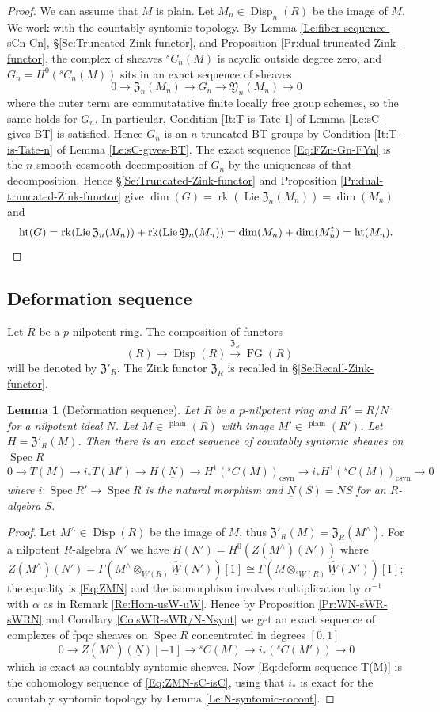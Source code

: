 \documentclass[a4paper,11pt]{amsart}
\theoremstyle{plain}
\newtheorem{Lemma}[equation]{Lemma}
\theoremstyle{definition}
\theoremstyle{remark}
\newcommand{\bLe}{\begin{Lemma}}
\newcommand{\eLe}{\end{Lemma}}
\newcommand{\bproof}{\begin{proof}}
\newcommand{\eproof}{\end{proof}}
\newcommand{\beqn}{\begin{equation}}
\newcommand{\eeqn}{\end{equation}}
\renewcommand{\u}{\underline}
\newcommand{\uM}{M} %
\numberwithin{equation}{section}
\newcommand{\FY}{\mathfrak{Y}}
\newcommand{\FZ}{\mathfrak{Z}}
\DeclareMathOperator{\csyn}{csyn}
\DeclareMathOperator{\height}{ht}
\DeclareMathOperator{\plain}{plain}
\DeclareMathOperator{\rk}{rk}
\DeclareMathOperator{\Disp}{Disp}
\DeclareMathOperator{\sDisp}{{}^sDisp}
\DeclareMathOperator{\FG}{FG}
\DeclareMathOperator{\Lie}{Lie}
\DeclareMathOperator{\Spec}{Spec}
\newcommand{\sC}{{}^{s}C}
\newcommand{\usW}{{}^s\u W}
\begin{document}
\bproof
We can assume that $\uM$ is plain.
Let $\uM_n\in\Disp_n(R)$ be the image of $\uM$.
We work with the countably syntomic topology.
By Lemma \ref{Le:fiber-sequence-sCn-Cn}, \S \ref{Se:Truncated-Zink-functor}, and Proposition \ref{Pr:dual-truncated-Zink-functor}, the complex of sheaves $\sC_n(\uM)$ is acyclic outside degree zero, and $G_n=H^0(\sC_n(\uM))$ sits in an exact sequence of sheaves
\beqn
\label{Eq:FZn-Gn-FYn}
0\to\FZ_n(\uM_n)\to G_n\to\FY_n(\uM_n)\to 0
\eeqn
where the outer term are commutatative finite locally free group schemes, so the same holds for $G_n$. 
In particular, Condition \eqref{It:T-is-Tate-1} of Lemma \ref{Le:sC-gives-BT} is satisfied. 
Hence $G_n$ is an $n$-truncated BT groups by Condition \eqref{It:T-is-Tate-n} of Lemma \ref{Le:sC-gives-BT}.
The exact sequence \eqref{Eq:FZn-Gn-FYn} is the $n$-smooth-cosmooth decomposition of $G_n$ by the uniqueness of that decomposition. Hence \S\ref{Se:Truncated-Zink-functor} and Proposition \ref{Pr:dual-truncated-Zink-functor} give $\dim(G)=\rk(\Lie\FZ_n(\uM_n))=\dim(\uM_n)$ and 
\[
\height(G)=\rk(\Lie\FZ_n(\uM_n))+\rk(\Lie\FY_n(\uM_n))=\dim(\uM_n)+\dim(\uM_n^t)=\height(\uM_n).
\qedhere
\]
\eproof

\subsection{Deformation sequence} 
\label{Se:Tate:deform-seq}

Let $R$ be a $p$-nilpotent ring. The composition of functors
\[
\sDisp(R)\to\Disp(R)\xrightarrow{\FZ_R}\FG(R)
\] 
will be denoted by $\FZ'_R$. The Zink functor $\FZ_R$ is recalled in \S\ref{Se:Recall-Zink-functor}.

\bLe[Deformation sequence]
\label{Le:deform-sequence-TM}
Let $R$ be a $p$-nilpotent ring and $R'=R/N$ for a nilpotent ideal $N$. Let $\uM\in\sDisp^{\plain}(R)$ with image $\uM'\in\sDisp^{\plain}(R')$. Let $H=\FZ'_R(\uM)$. Then there is an exact sequence of countably syntomic sheaves on $\Spec R$ 
\beqn
\label{Eq:deform-sequence-T(M)}
0\to T(\uM)\to i_*T(\uM')\to H(\u N)\to H^1(\sC(\uM))_{\csyn}\to i_*H^1(\sC(\uM))_{\csyn}\to 0
\eeqn
where $i\colon \Spec R'\to \Spec R$ is the natural morphism and $\u N(S)=NS$ for an $R$-algebra $S$. 
\eLe

\bproof
Let $\uM^\wedge\in\Disp(R)$ be the image of $\uM$, thus $\FZ'_R(\uM)=\FZ_R(\uM^\wedge)$. For a nilpotent $R$-algebra $N'$ we have $H(N')=H^0(Z(\uM^\wedge)(N'))$ where 
\[
Z(\uM^\wedge)(N')=\Gamma(\uM^\wedge\otimes_{\u W(R)}\u{\hat W}(N')) [1] 
\cong\Gamma(\uM\otimes_{\usW(R)}\u{\hat W}(N')) [1];
\]
the equality is \eqref{Eq:ZMN} and the isomorphism involves multiplication by $\alpha^{-1}$ with $\alpha$ as in Remark \ref{Re:Hom-usW-uW}. Hence by Proposition \ref{Pr:WN-sWR-sWRN} and Corollary \ref{Co:sWR-sWR/N-Nsynt} we get an exact sequence of complexes of fpqc sheaves on $\Spec R$ concentrated in degrees $[0,1]$ 
\beqn
\label{Eq:ZMN-sC-isC}
0\to Z(\uM^\wedge)(\u N)[-1]\to \sC(\uM)\to i_*(\sC(\uM'))\to 0
\eeqn
which is exact as countably syntomic sheaves.
Now \eqref{Eq:deform-sequence-T(M)} is the cohomology sequence of \eqref{Eq:ZMN-sC-isC}, using that $i_*$ is exact for the countably syntomic topology by Lemma \ref{Le:N-syntomic-cocont}.
\eproof
\end{document}
